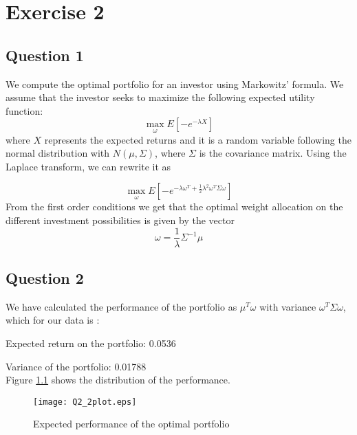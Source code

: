 \chapter{Exercise 2}

\section{Question 1}
We compute the optimal portfolio for an investor using Markowitz' formula. We assume that the investor seeks to maximize the following expected utility function:
\begin{equation*}
\max_\omega E\left[-e^{-\lambda X}\right]
\end{equation*}
where $X$ represents the expected returns and it is a random variable following the normal distribution with $N(\mu, \Sigma)$, where $\Sigma$ is the covariance matrix. Using the Laplace transform, we can rewrite it as

\begin{equation*}
\max_\omega E\left[-e^{{-\lambda \omega^T+}\frac{1}{2}\lambda^2\omega^T\Sigma\omega}\right]
\end{equation*}
From the first order conditions we get that the optimal weight allocation on the different investment possibilities is given by the vector
\begin{equation*}
\omega = \frac{1}{\lambda}\Sigma^{-1}\mu
\end{equation*}

\section{Question 2}

We have calculated the performance of the portfolio as $\mu^T\omega$ with variance $\omega^T\Sigma\omega$, which for our data is :

Expected return on the portfolio: 0.0536

Variance of the portfolio: 0.01788
\\
Figure \ref{fig4} shows the distribution of the performance.

\begin{figure}[ht]
\centering
\texttt{[image: Q2\_2plot.eps]}
\caption{Expected performance of the optimal portfolio }
\label{fig4}
\end{figure}
